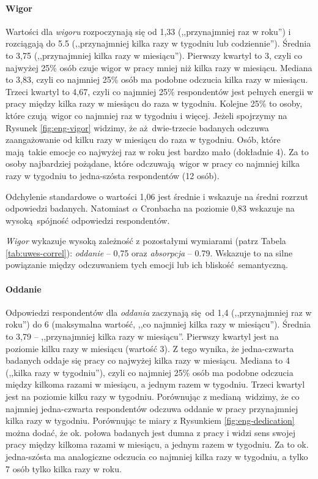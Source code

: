 \paragraph{Wigor} Wartości dla \textit{wigoru} rozpoczynają się od 1,33 (,,przynajmniej raz w roku'') i rozciągają do 5.5 (,,przynajmniej kilka razy w tygodniu lub codziennie''). Średnia to 3,75 (,,przynajmniej kilka razy w miesiącu''). Pierwszy kwartyl to 3, czyli co najwyżej 25\% osób czuje wigor w pracy mniej niż kilka razy w miesiącu. Mediana to 3,83, czyli co najmniej 25\% osób ma podobne odczucia kilka razy w miesiącu. Trzeci kwartyl to 4,67, czyli co najmniej 25\%
respondentów jest pełnych energii w pracy między kilka razy w miesiącu do raza w tygodniu. Kolejne 25\% to osoby, które czują wigor co najmniej raz w tygodniu i więcej. Jeżeli spojrzymy na Rysunek \ref{fig:eng-vigor} widzimy, że aż dwie-trzecie badanych odczuwa zaangażowanie od kilku razy w miesiącu do raza w tygodniu. Osób, które mają takie emocje co najwyżej raz w roku jest bardzo mało (dokładnie 4). Za to osoby najbardziej pożądane, które odczuwają wigor w pracy co najmniej
kilka razy w tygodniu to jedna-szósta respondentów (12 osób).

Odchylenie standardowe o wartości 1,06 jest średnie i wskazuje na średni rozrzut odpowiedzi badanych. Natomiast $\alpha$ Cronbacha na poziomie 0,83 wskazuje na wysoką spójność odpowiedzi respondentów.

\textit{Wigor} wykazuje wysoką zależność z pozostałymi wymiarami (patrz Tabela \ref{tab:uwes-correl}): \textit{oddanie} -- 0,75 oraz \textit{absorpcja} -- 0.79. Wskazuje to na silne powiązanie między odczuwaniem tych emocji lub ich bliskość semantyczną.

\paragraph{Oddanie} Odpowiedzi respondentów dla \textit{oddania} zaczynają się od 1,4 (,,przynajmniej raz w roku'') do 6 (maksymalna wartość, ,,co najmniej kilka razy w miesiącu''). Średnia to 3,79 -- ,,przynajmniej kilka razy w miesiącu''. Pierwszy kwartyl jest na poziomie kilku razy w miesiącu (wartość 3). Z tego wynika, że jedna-czwarta badanych oddaje się pracy co najwyżej kilka razy w miesiącu. Mediana to 4 (,,kilka razy w tygodniu''), czyli co najmniej 25\% osób ma podobne odczucia
między kilkoma razami w miesiącu, a jednym razem w tygodniu. Trzeci kwartyl jest na poziomie kilku razy w tygodniu. Porównując z medianą widzimy, że co najmniej jedna-czwarta respondentów odczuwa oddanie w pracy przynajmniej kilka razy w tygodniu. Porównując te miary z Rysunkiem \ref{fig:eng-dedication} można dodać, że ok. połowa badanych jest dumna z pracy i widzi sens swojej pracy między kilkoma razami w miesiącu, a jednym razem w tygodniu. Za to ok.
jedna-szósta ma analogiczne odczucia co najmniej kilka razy w tygodniu, a tylko 7 osób tylko kilka razy w roku.

